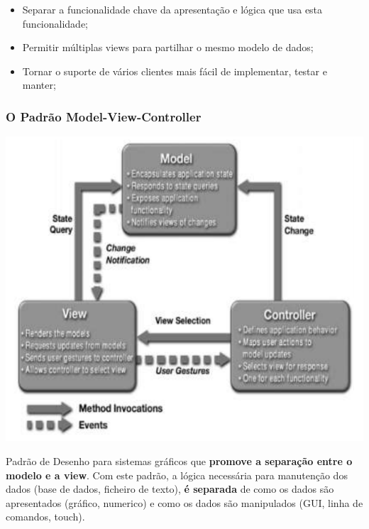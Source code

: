 \documentclass{article}
\begin{document}
\begin{flushleft}
  \begin{itemize}
    \item Separar a funcionalidade chave da apresentação e lógica que usa esta funcionalidade;
    \item Permitir múltiplas views para partilhar o mesmo modelo de dados;
    \item Tornar o suporte de vários clientes mais fácil de implementar, testar e manter;
  \end{itemize}
\end{flushleft}

\subsubsection{O Padrão Model-View-Controller}

\vspace{3mm}

\begin{center}
  \includegraphics[scale=0.3]{7}
\end{center}

\pagebreak

\begin{flushleft}
  Padrão de Desenho para sistemas gráficos que \textbf{promove a separação entre o modelo e a view}.
  Com este padrão, a lógica necessária para manutenção dos dados (base de dados, ficheiro de texto),
  \textbf{é separada} de como os dados são apresentados (gráfico, numerico) e como
  os dados são manipulados (GUI, linha de comandos, touch).
\end{flushleft}
\end{document}
